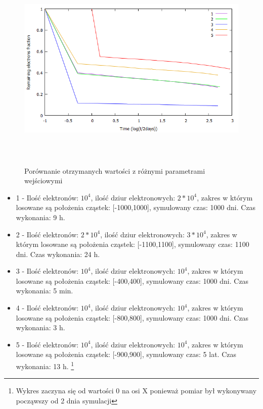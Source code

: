 \begin{figure}[H]
\centering
\includegraphics[width=17cm, height = 10cm]{wykres_all}
\caption{Porównanie otrzymanych wartości z różnymi parametrami wejściowymi}
\label{rys:1}
\end{figure}
\newpage
\begin{itemize}
\item 1 - Ilość elektronów: $10^{4}$, ilość dziur elektronowych: $2*10^{4}$, zakres w którym losowane są położenia cząstek: [-1000,1000], symulowany czas: 1000 dni. Czas wykonania: 9 h.
\item 2 - Ilość elektronów: $2*10^{4}$, ilość dziur elektronowych: $3*10^{4}$, zakres w którym losowane są położenia cząstek: [-1100,1100], symulowany czas: 1100 dni. Czas wykonania: 24 h.
\item 3 - Ilość elektronów: $10^{4}$, ilość dziur elektronowych: $10^{4}$, zakres w którym losowane są położenia cząstek: [-400,400], symulowany czas: 1000 dni. Czas wykonania: 5 min.
\label{wykres:1}
\item 4 - Ilość elektronów: $10^{4}$, ilość dziur elektronowych: $10^{4}$, zakres w którym losowane są położenia cząstek: [-800,800], symulowany czas: 1000 dni. Czas wykonania: 3 h.
\label{wykres:2}
\item 5 - Ilość elektronów: $10^{4}$, ilość dziur elektronowych: $10^{4}$, zakres w którym losowane są położenia cząstek: [-900,900], symulowany czas: 5 lat. Czas wykonania: 13 h. \footnote{Wykres zaczyna się od wartości 0 na osi X ponieważ pomiar był wykonywany począwszy od 2 dnia symulacji }
\end{itemize}


